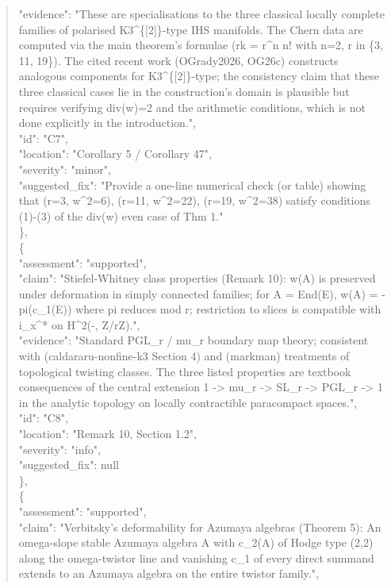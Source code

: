 \documentclass[11pt]{article}
\begin{document}
\begin{quote}
      "evidence": "These are specialisations to the three classical locally complete families of polarised K3\^{}\{[2]\}-type IHS manifolds. The Chern data are computed via the main theorem's formulae (rk = r\^{}n n! with n=2, r in \{3, 11, 19\}). The cited recent work (OGrady2026, OG26c) constructs analogous components for K3\^{}\{[2]\}-type; the consistency claim that these three classical cases lie in the construction's domain is plausible but requires verifying div(w)=2 and the arithmetic conditions, which is not done explicitly in the introduction.",\\
      "id": "C7",\\
      "location": "Corollary 5 / Corollary 47",\\
      "severity": "minor",\\
      "suggested\_fix": "Provide a one-line numerical check (or table) showing that (r=3, w\^{}2=6), (r=11, w\^{}2=22), (r=19, w\^{}2=38) satisfy conditions (1)-(3) of the div(w) even case of Thm 1."\\
    \},\\
    \{\\
      "assessment": "supported",\\
      "claim": "Stiefel-Whitney class properties (Remark 10): w(A) is preserved under deformation in simply connected families; for A = End(E), w(A) = -pi(c\_1(E)) where pi reduces mod r; restriction to slices is compatible with i\_x\^{}* on H\^{}2(-, Z/rZ).",\\
      "evidence": "Standard PGL\_r / mu\_r boundary map theory; consistent with (caldararu-nonfine-k3 Section 4) and (markman) treatments of topological twisting classes. The three listed properties are textbook consequences of the central extension 1 -> mu\_r -> SL\_r -> PGL\_r -> 1 in the analytic topology on locally contractible paracompact spaces.",\\
      "id": "C8",\\
      "location": "Remark 10, Section 1.2",\\
      "severity": "info",\\
      "suggested\_fix": null\\
    \},\\
    \{\\
      "assessment": "supported",\\
      "claim": "Verbitsky's deformability for Azumaya algebras (Theorem 5): An omega-slope stable Azumaya algebra A with c\_2(A) of Hodge type (2,2) along the omega-twistor line and vanishing c\_1 of every direct summand extends to an Azumaya algebra on the entire twistor family.",\\

\end{quote}
\end{document}
